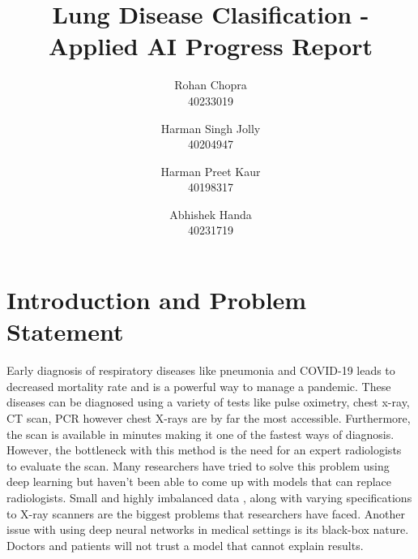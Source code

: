\documentclass[10pt,twocolumn,letterpaper]{article}
\def\subName{Applied AI }
\begin{document}
\def\cvprPaperID{Group-Q} %
\def\confName{COMP6721}
\def\confYear{2022}
\title{Lung Disease Clasification - \subName Progress Report}
\author{Rohan Chopra\\
\small 40233019\\
\and
Harman Singh Jolly\\
\small 40204947\\
\and
Harman Preet Kaur\\
\small 40198317\\
\and
Abhishek Handa\\
\small 40231719\\
}
\maketitle
\section{Introduction and Problem Statement}
\label{sec:intro}

Early diagnosis of respiratory diseases like pneumonia and COVID-19 leads to decreased mortality rate \cite{daniel2016time} and is a powerful way to manage a pandemic\cite{xu2020facile}. These diseases can be diagnosed using a variety of tests like pulse oximetry, chest x-ray, CT scan\cite{mattsmith2022},  PCR\cite{akhtar1996pcr} however chest X-rays are by far the most accessible\cite{frija2021improve}. Furthermore, the scan is available in minutes making it one of the fastest ways of diagnosis\cite{healthwise2021}. However, the bottleneck with this method is the need for an expert radiologists to evaluate the scan\cite{mehrotra2009radiologists}. Many researchers have tried to solve this problem using deep learning \cite{wang2021deep} but haven't been able to come up with models that can replace radiologists. Small \cite{guefrechi2021deep} and highly imbalanced data \cite{wang2021deep}, along with varying specifications to X-ray scanners are the biggest problems \cite{melissarohman2018} that researchers have faced. Another issue with using deep neural networks in medical settings is its black-box nature\cite{paulblazek2022}. Doctors and patients will not trust a model that cannot explain results\cite{aleksandra2019}. 
\end{document}
